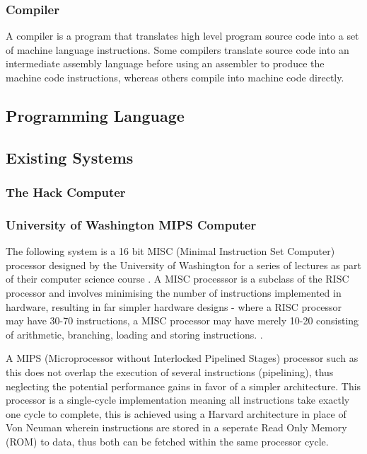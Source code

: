 \subsubsection{Compiler}
\label{sec:Compiler}
A compiler is a program that translates high level program source code into a set of machine language instructions. Some compilers translate source code into an intermediate assembly language before using an assembler to produce the machine code instructions, whereas others compile into machine code directly.

\subsection{Programming Language}
\subsection{Existing Systems}
\subsubsection{The Hack Computer}
\subsubsection{University of Washington MIPS Computer}
The following system is a 16 bit MISC (Minimal Instruction Set Computer) processor designed by the University of Washington for a series of lectures as part of their computer science course \textcite{MIPS-uw}. A MISC processsor is a subclass of the RISC processor and involves minimising the number of instructions implemented in hardware, resulting in far simpler hardware designs - where a RISC processor may have 30-70 instructions, a MISC processor may have merely 10-20 consisting of arithmetic, branching, loading and storing instructions. \textcite{MISC-dakeng}. 

A MIPS (Microprocessor without Interlocked Pipelined Stages) processor such as this does not overlap the execution of several instructions (pipelining), thus neglecting the potential performance gains in favor of a simpler architecture. This processor is a single-cycle implementation meaning all instructions take exactly one cycle to complete, this is achieved using a Harvard architecture in place of Von Neuman wherein instructions are stored in a seperate Read Only Memory (ROM) to data, thus both can be fetched within the same processor cycle. 

